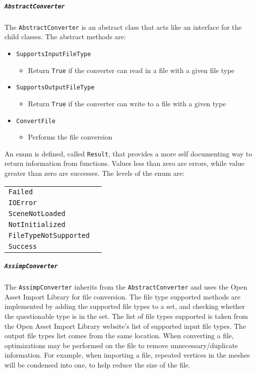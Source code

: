     \subparagraph{\texttt{AbstractConverter}}
    \hfill \break
    The \texttt{AbstractConverter} is an abstract class that acts like an interface for the child classes.  The abstract methods are:
    \begin{itemize}
        \item \texttt{SupportsInputFileType}
        \begin{itemize}
            \item Return \texttt{True} if the converter can read in a file with a given file type
        \end{itemize}

        \item \texttt{SupportsOutputFileType}
        \begin{itemize}
            \item Return \texttt{True} if the converter can write to a file with a given type
        \end{itemize}

        \item \texttt{ConvertFile}
        \begin{itemize}
            \item Performs the file conversion
        \end{itemize}
    \end{itemize}

    An enum is defined, called \texttt{Result}, that provides a more self documenting way to return information from functions.  Values less than zero are errors, while
    value greater than zero are successes.  The levels of the enum are:
    
    \begin{tabular}{l l}
        \centering
        \texttt{Failed} &\\
        \texttt{IOError} &\\
        \texttt{SceneNotLoaded} &\\
        \texttt{NotInitialized} &\\
        \texttt{FileTypeNotSupported} &\\
        \texttt{Success} &
    \end{tabular}

    \subparagraph{\texttt{AssimpConverter}}
    \hfill \break
    The \texttt{AssimpConverter} inherits from the \texttt{AbstractConverter} and uses the Open Asset Import Library for file conversion.  
    The file type supported methods are implemented by adding the supported file types to a set, and checking whether the questionable type is in the set.
    The list of file types supported is taken from the Open Asset Import Library website's list of supported input file types.  
    The output file types list comes from the same location.
    When converting a file, optimizations may be performed on the file to remove unnecessary/duplicate information.  For example, when importing a file, 
    repeated vertices in the meshes will be condensed into one, to help reduce the size of the file.

